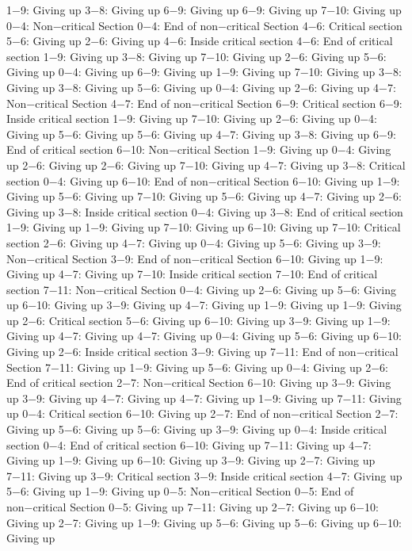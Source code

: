 1−9: Giving up
3−8: Giving up
6−9: Giving up
6−9: Giving up
7−10: Giving up
0−4: Non−critical Section
0−4: End of non−critical Section
4−6: Critical section
5−6: Giving up
2−6: Giving up
4−6: Inside critical section
4−6: End of critical section
1−9: Giving up
3−8: Giving up
7−10: Giving up
2−6: Giving up
5−6: Giving up
0−4: Giving up
6−9: Giving up
1−9: Giving up
7−10: Giving up
3−8: Giving up
3−8: Giving up
5−6: Giving up
0−4: Giving up
2−6: Giving up
4−7: Non−critical Section
4−7: End of non−critical Section
6−9: Critical section
6−9: Inside critical section
1−9: Giving up
7−10: Giving up
2−6: Giving up
0−4: Giving up
5−6: Giving up
5−6: Giving up
4−7: Giving up
3−8: Giving up
6−9: End of critical section
6−10: Non−critical Section
1−9: Giving up
0−4: Giving up
2−6: Giving up
2−6: Giving up
7−10: Giving up
4−7: Giving up
3−8: Critical section
0−4: Giving up
6−10: End of non−critical Section
6−10: Giving up
1−9: Giving up
5−6: Giving up
7−10: Giving up
5−6: Giving up
4−7: Giving up
2−6: Giving up
3−8: Inside critical section
0−4: Giving up
3−8: End of critical section
1−9: Giving up
1−9: Giving up
7−10: Giving up
6−10: Giving up
7−10: Critical section
2−6: Giving up
4−7: Giving up
0−4: Giving up
5−6: Giving up
3−9: Non−critical Section
3−9: End of non−critical Section
6−10: Giving up
1−9: Giving up
4−7: Giving up
7−10: Inside critical section
7−10: End of critical section
7−11: Non−critical Section
0−4: Giving up
2−6: Giving up
5−6: Giving up
6−10: Giving up
3−9: Giving up
4−7: Giving up
1−9: Giving up
1−9: Giving up
2−6: Critical section
5−6: Giving up
6−10: Giving up
3−9: Giving up
1−9: Giving up
4−7: Giving up
4−7: Giving up
0−4: Giving up
5−6: Giving up
6−10: Giving up
2−6: Inside critical section
3−9: Giving up
7−11: End of non−critical Section
7−11: Giving up
1−9: Giving up
5−6: Giving up
0−4: Giving up
2−6: End of critical section
2−7: Non−critical Section
6−10: Giving up
3−9: Giving up
3−9: Giving up
4−7: Giving up
4−7: Giving up
1−9: Giving up
7−11: Giving up
0−4: Critical section
6−10: Giving up
2−7: End of non−critical Section
2−7: Giving up
5−6: Giving up
5−6: Giving up
3−9: Giving up
0−4: Inside critical section
0−4: End of critical section
6−10: Giving up
7−11: Giving up
4−7: Giving up
1−9: Giving up
6−10: Giving up
3−9: Giving up
2−7: Giving up
7−11: Giving up
3−9: Critical section
3−9: Inside critical section
4−7: Giving up
5−6: Giving up
1−9: Giving up
0−5: Non−critical Section
0−5: End of non−critical Section
0−5: Giving up
7−11: Giving up
2−7: Giving up
6−10: Giving up
2−7: Giving up
1−9: Giving up
5−6: Giving up
5−6: Giving up
6−10: Giving up

